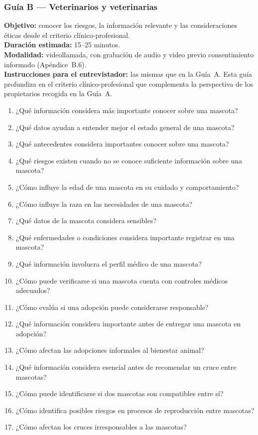 \documentclass[journal,onecolumn]{IEEEtran}
\begin{document}
	\subsubsection*{Guía B --- Veterinarios y veterinarias}
	
	\textbf{Objetivo:} conocer los riesgos, la información relevante y las
	consideraciones éticas desde el criterio clínico-profesional.\\
	\textbf{Duración estimada:} 15--25 minutos.\\
	\textbf{Modalidad:} videollamada, con grabación de audio y video previo
	consentimiento informado (Apéndice~B.6).\\
	\textbf{Instrucciones para el entrevistador:} las mismas que en la Guía~A. Esta
	guía profundiza en el criterio clínico-profesional que complementa la perspectiva
	de los propietarios recogida en la Guía~A.
	
	\begin{enumerate}[leftmargin=*, itemsep=1pt]
		\item ¿Qué información considera más importante conocer sobre una mascota?
		\item ¿Qué datos ayudan a entender mejor el estado general de una mascota?
		\item ¿Qué antecedentes considera importantes conocer sobre una mascota?
		\item ¿Qué riesgos existen cuando no se conoce suficiente información sobre una mascota?
		\item ¿Cómo influye la edad de una mascota en su cuidado y comportamiento?
		\item ¿Cómo influye la raza en las necesidades de una mascota?
		\item ¿Qué datos de la mascota considera sensibles?
		\item ¿Qué enfermedades o condiciones considera importante registrar en una mascota?
		\item ¿Qué información involucra el perfil médico de una mascota?
		\item ¿Cómo puede verificarse si una mascota cuenta con controles médicos adecuados?
		\item ¿Cómo evalúa si una adopción puede considerarse responsable?
		\item ¿Qué información considera importante antes de entregar una mascota en adopción?
		\item ¿Cómo afectan las adopciones informales al bienestar animal?
		\item ¿Qué información considera esencial antes de recomendar un cruce entre mascotas?
		\item ¿Cómo puede identificarse si dos mascotas son compatibles entre sí?
		\item ¿Cómo identifica posibles riesgos en procesos de reproducción entre mascotas?
		\item ¿Cómo afectan los cruces irresponsables a las mascotas?
	\end{enumerate}
	
\end{document}
